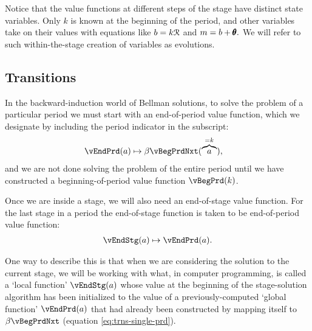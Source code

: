 \documentclass[titlepage, headings=optiontotocandhead]{Resources/texmf-local/tex/latex/econtex}
\begin{document}
  Notice that the value functions at different {step}s of the {stage} have distinct state variables.  Only $k$ is known at the beginning of the period, and other variables take on their values with equations like $b = k \mathcal{R}$ and $m = b+\pmb{\theta}.$  We will refer to such within-the-{stage} creation of variables as {evolutions}.%

\subsection{Transitions}

  In the backward-induction world of Bellman solutions, to solve the problem of a particular {period} we must start with an end-of-{period} value function, which we designate by including the {period} indicator in the subscript:
  \begin{equation}\begin{gathered}\begin{aligned}
        \vEndPrd(a) & \mapsto \beta \vBegPrdNxt(\overbrace{a}^{=k}), \label{eq:trns-single-prd}
  \end{aligned}\end{gathered}\end{equation}
and we are not done solving the problem of the entire {period} until we have constructed a beginning-of-{period} value function $\vBegPrd(k)$.

Once we are inside a {stage}, we will also need an end-of-{stage} value function.  For the last {stage} in a {period} the end-of-{stage} function is taken to be end-of-{period} value function:
  \begin{equation}\begin{gathered}\begin{aligned}
        \vEndStg(a) \mapsto \vEndPrd(a).
      \end{aligned}\end{gathered}\end{equation}

One way to describe this is that when we are considering the solution to the current {stage}, we will be working with what, in computer programming, is called a `local function' $\vEndStg(a)$ whose value at the beginning of the {stage}-solution algorithm has been initialized to the value of a previously-computed `global function' $\vEndPrd(a)$ that had already been constructed by mapping itself to $\beta \vBegPrdNxt$ (equation \eqref{eq:trns-single-prd}).
\hypertarget{decision-problem}{}
\end{document}
